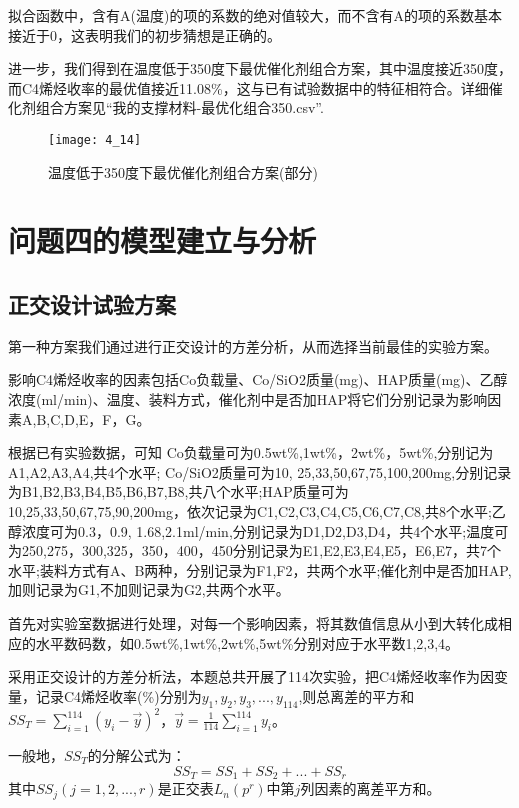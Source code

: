 \documentclass[withoutpreface,bwprint]{cumcmthesis} %
\begin{document}
拟合函数中，含有A(温度)的项的系数的绝对值较大，而不含有A的项的系数基本接近于0，这表明我们的初步猜想是正确的。

进一步，我们得到在温度低于350度下最优催化剂组合方案，其中温度接近350度，而C4烯烃收率的最优值接近11.08\%，这与已有试验数据中的特征相符合。详细催化剂组合方案见“我的支撑材料-最优化组合350.csv”.

\begin{figure}[!h]
	\centering
	\texttt{[image: 4\_14]}
	\caption{温度低于350度下最优催化剂组合方案(部分)}
	\label{fig:circuit-diagram1}
\end{figure}


\newpage
\section{问题四的模型建立与分析}
\subsection{正交设计试验方案}
第一种方案我们通过进行正交设计的方差分析，从而选择当前最佳的实验方案。

影响C4烯烃收率的因素包括Co负载量、Co/SiO2质量(mg)、HAP质量(mg)、乙醇浓度(ml/min)、温度、装料方式，催化剂中是否加HAP将它们分别记录为影响因素A,B,C,D,E，F，G。

根据已有实验数据，可知
Co负载量可为0.5wt\%,1wt\%，2wt\%，5wt\%,分别记为A1,A2,A3,A4,共4个水平; Co/SiO2质量可为10, 25,33,50,67,75,100,200mg,分别记录为B1,B2,B3,B4,B5,B6,B7,B8,共八个水平;HAP质量可为10,25,33,50,67,75,90,200mg，依次记录为C1,C2,C3,C4,C5,C6,C7,C8,共8个水平;乙醇浓度可为0.3，0.9, 1.68,2.1ml/min,分别记录为D1,D2,D3,D4，共4个水平;温度可为250,275，300,325，350，400，450分别记录为E1,E2,E3,E4,E5，E6,E7，共7个水平;装料方式有A、B两种，分别记录为F1,F2，共两个水平;催化剂中是否加HAP,加则记录为G1,不加则记录为G2,共两个水平。

首先对实验室数据进行处理，对每一个影响因素，将其数值信息从小到大转化成相应的水平数码数，如0.5wt\%,1wt\%,2wt\%,5wt\%分别对应于水平数1,2,3,4。


采用正交设计的方差分析法，本题总共开展了114次实验，把C4烯烃收率作为因变量，记录C4烯烃收率(\%)分别为$y_1,y_2,y_3,...,  y_{114}$,则总离差的平方和$SS_T=\sum_{i=1}^{114}{(y_i-\vec{y})^2}$，$\vec{y}=\frac{1}{114}\sum_{i=1}^{114}y_i$。

一般地，$SS_T$的分解公式为：
\begin{equation*}
	SS_T = SS_1 + SS_2 + ... + SS_r
\end{equation*}
其中$SS_j(j = 1,2,...,r)$是正交表$L_n(p^r)$中第$j$列因素的离差平方和。
\end{document}
